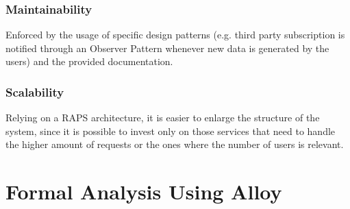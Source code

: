 \documentclass[12pt,a4paper]{article}
\begin{document}
	\subsubsection{Maintainability}
	Enforced by the usage of specific design patterns (e.g. third party subscription is notified through an Observer Pattern whenever new data is generated by the users) and the provided documentation.
	\subsubsection{Scalability}
	Relying on a RAPS architecture, it is easier to enlarge the structure of the system, since it is possible to invest only on those services that need to handle the higher amount of requests or the ones where the number of users is relevant.
	
	
	\newpage
	\section{Formal Analysis Using Alloy}
	
	\newpage
	
\end{document}
